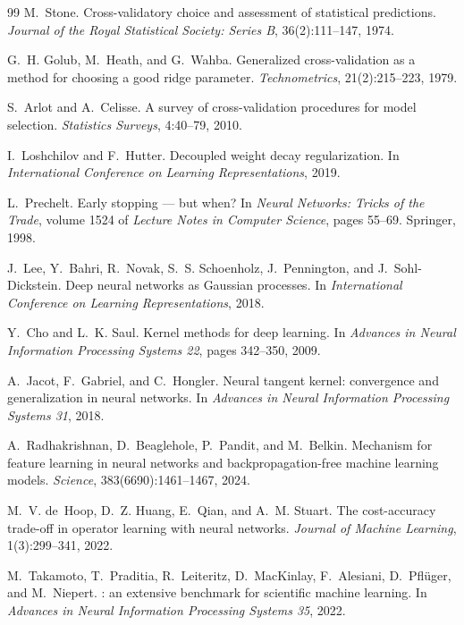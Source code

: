 \begin{thebibliography}{99}
M.~Stone.
\newblock Cross-validatory choice and assessment of statistical predictions.
\newblock \emph{Journal of the Royal Statistical Society: Series B}, 36(2):111--147, 1974.

G.~H. Golub, M.~Heath, and G.~Wahba.
\newblock Generalized cross-validation as a method for choosing a good ridge parameter.
\newblock \emph{Technometrics}, 21(2):215--223, 1979.

S.~Arlot and A.~Celisse.
\newblock A survey of cross-validation procedures for model selection.
\newblock \emph{Statistics Surveys}, 4:40--79, 2010.

I.~Loshchilov and F.~Hutter.
\newblock Decoupled weight decay regularization.
\newblock In \emph{International Conference on Learning Representations}, 2019.

L.~Prechelt.
\newblock Early stopping --- but when?
\newblock In \emph{Neural Networks: Tricks of the Trade}, volume 1524 of \emph{Lecture Notes
in Computer Science}, pages 55--69. Springer, 1998.

J.~Lee, Y.~Bahri, R.~Novak, S.~S. Schoenholz, J.~Pennington, and J.~Sohl-Dickstein.
\newblock Deep neural networks as {Gaussian} processes.
\newblock In \emph{International Conference on Learning Representations}, 2018.

Y.~Cho and L.~K. Saul.
\newblock Kernel methods for deep learning.
\newblock In \emph{Advances in Neural Information Processing Systems 22}, pages 342--350, 2009.

A.~Jacot, F.~Gabriel, and C.~Hongler.
\newblock Neural tangent kernel: convergence and generalization in neural networks.
\newblock In \emph{Advances in Neural Information Processing Systems 31}, 2018.

A.~Radhakrishnan, D.~Beaglehole, P.~Pandit, and M.~Belkin.
\newblock Mechanism for feature learning in neural networks and backpropagation-free machine
learning models.
\newblock \emph{Science}, 383(6690):1461--1467, 2024.

M.~V. de~Hoop, D.~Z. Huang, E.~Qian, and A.~M. Stuart.
\newblock The cost-accuracy trade-off in operator learning with neural networks.
\newblock \emph{Journal of Machine Learning}, 1(3):299--341, 2022.

M.~Takamoto, T.~Praditia, R.~Leiteritz, D.~MacKinlay, F.~Alesiani, D.~Pfl\"uger, and
M.~Niepert.
: an extensive benchmark for scientific machine learning.
\newblock In \emph{Advances in Neural Information Processing Systems 35}, 2022.


\end{thebibliography}
